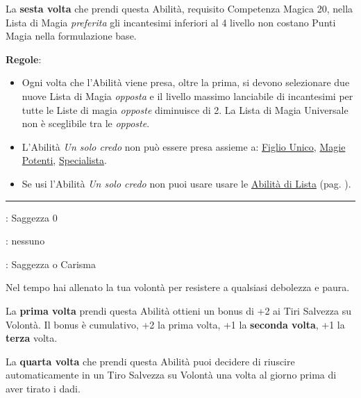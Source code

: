 \begin{multicols}{2}
La \textbf{sesta volta} che prendi questa Abilità, requisito Competenza Magica 20, nella Lista di Magia \emph{preferita} gli incantesimi inferiori al 4 livello non costano Punti Magia nella formulazione base.

\medskip

\textbf{Regole}:

\smallskip

\begin{itemize}[leftmargin=*] \setlength{\itemsep}{0pt}
\item Ogni volta che l'Abilità viene presa, oltre la prima, si devono selezionare due nuove Lista di Magia \emph{opposta} e il livello massimo lanciabile di incantesimi per tutte le Liste di magia \emph{opposte} diminuisce di 2.  La Lista di Magia Universale non è sceglibile tra le \emph{opposte}.

\item L'Abilità \emph{Un solo credo} non può essere presa assieme a: \hyperlink{figliounico}{Figlio Unico}, \hyperlink{magiepotenti}{Magie Potenti}, \hyperlink{specialista}{Specialista}.

\item Se usi l'Abilità \emph{Un solo credo} non puoi usare usare le \hyperlink{abilitadilista}{Abilità di Lista} (pag. \pageref{abilitadilista}).
\end{itemize}

\smallskip\noindent\rule{\linewidth}{2pt} \hypertarget{Volonta' Ferrea}{}\medskip{}
\noindent
\begin{description}[noitemsep, topsep=0pt, parsep=0pt, partopsep=0pt, leftmargin=0cm, labelwidth=2.5cm]
    \item[\textbf{Requisito}]: Saggezza 0
    \item[\textbf{Tiri Salvezza}]: nessuno
    \item[\textbf{Caratteristica}]: Saggezza o Carisma
\end{description}

Nel tempo hai allenato la tua volontà per resistere a qualsiasi debolezza e paura.

La \textbf{prima volta} prendi questa Abilità ottieni un bonus di +2 ai Tiri Salvezza su Volontà. Il bonus è cumulativo, +2 la prima volta, +1 la \textbf{seconda volta}, +1 la \textbf{terza} volta.

La \textbf{quarta volta} che prendi questa Abilità puoi decidere di riuscire automaticamente in un Tiro Salvezza su Volontà una volta al giorno prima di aver tirato i dadi.


\end{multicols}
